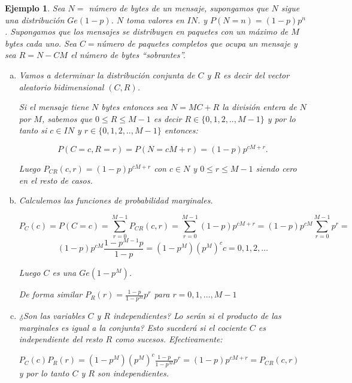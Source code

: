 \documentclass[12pt]{report}
\newtheorem{example}[definition]{Ejemplo}
\def\N{I\!\!N}
\begin{document}
        \begin{example}
              Sea $N=$ número de bytes de un mensaje, supongamos que $N$ sigue
              una distribución $Ge(1-p)$. $N$ toma valores en $\N$.
              y $P(N=n)=(1-p) p^n$. Supongamos
              que los mensajes se distribuyen en paquetes con un máximo de $M$
              bytes cada uno. Sea $C=$número de paquetes completos que ocupa
              un mensaje y sea $R=N-CM$ el número de bytes ``sobrantes''.
              \begin{enumerate}[a)] 
              \item Vamos a determinar la distribución conjunta de $C$ y $R$ es decir
              del vector aleatorio bidimensional $(C,R)$.

              Si el mensaje tiene $N$ bytes entonces sea
             $N=MC+R$ la división entera de $N$ por $M$, sabemos que
             $0\leq R\leq M-1$ es decir $R\in\{0,1,2,..,M-1\}$ y por lo tanto
             si $c\in\N$ y $r\in\{0,1,2,..,M-1\}$ entonces:

             $$P(C=c,R=r)= P(N=cM+r)=(1-p) p^{cM+r}.$$

             Luego $P_{CR}(c,r)=(1-p) p^{cM+r}$ con $c\in N$ y $0\leq r\leq
             M-1$ siendo cero en el resto de casos.

             \item Calculemos las funciones de probabilidad marginales.

             $$P_{C}(c)=P(C=c)=\sum_{r=0}^{M-1} P_{CR}(c,r)=\sum_{r=0}^{M-1}(1-p) p^{cM+r}=
             (1-p) p^{cM} \sum_{r=0}^{M-1} p^r=$$
             $$ (1-p)
             p^{cM}\frac{1-p^{M-1}p}{1-p}=(1-p^M) {(p^M)}^{c} c=0,1,2,\ldots$$

             Luego $C$ es una $Ge(1-p^{M})$.

             De forma similar $P_{R}(r)=\frac{1-p}{1-p^M} p^r$ para
             $r=0,1,\ldots,M-1$

             \item ¿Son las variables $C$ y $R$ independientes?  Lo serán si el producto de las marginales es igual a la conjunta? Esto sucederá si el cociente $C$ es independiente del resto $R$
             como sucesos. Efectivamente:

             $P_{C}(c) P_{R}(r)=(1-p^M) {(p^M)}^{c} \frac{1-p}{1-p^M} p^r=
             (1-p) p^{cM+r}=P_{CR}(c,r)$ y por lo tanto $C$ y $R$ son independientes.
\end{enumerate}
\end{example}
\end{document}
